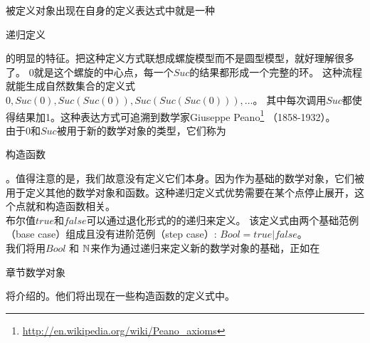 \documentclass[twocolumn]{article}
\begin{document}
\begin{CJK}{UTF8}{gbsn}
\indent \indent 被定义对象出现在自身的定义表达式中就是一种\begin{CJK}{UTF8}{gkai}递归定义\end{CJK}的明显的特征。把这种定义方式联想成螺旋模型而不是圆型模型，就好理解很多了。 $0$就是这个螺旋的中心点，每一个$Suc$的结果都形成一个完整的环。 这种流程就能生成自然数集合的定义式$0, Suc(0), Suc(Suc(0)), Suc(Suc(Suc(0))), \ldots$。 其中每次调用$Suc$都使得结果加1。这种表达方式可追溯到数学家Giuseppe Peano\footnote{\url{http://en.wikipedia.org/wiki/Peano_axioms}} （1858-1932）。\\


\indent \indent 由于$0$和$Suc$被用于新的数学对象的类型，它们称为\begin{CJK}{UTF8}{gkai}构造函数\end{CJK}。值得注意的是，我们故意没有定义它们本身。因为作为基础的数学对象，它们被用于定义其他的数学对象和函数。这种递归定义式优势需要在某个点停止展开，这个点就和构造函数相关。\\

\indent \indent 布尔值$true$和$false$可以通过退化形式的的递归来定义。 该定义式由两个基础范例（base case）组成且没有进阶范例（step case）: $Bool = true | false$。\\


\indent \indent 我们将用$Bool$ 和 $\mathbb{N}$来作为通过递归来定义新的数学对象的基础，正如在\begin{CJK}{UTF8}{gkai}章节数学对象\end{CJK}将介绍的。他们将出现在一些构造函数的定义式中。\\


\end{CJK}
\end{document}

